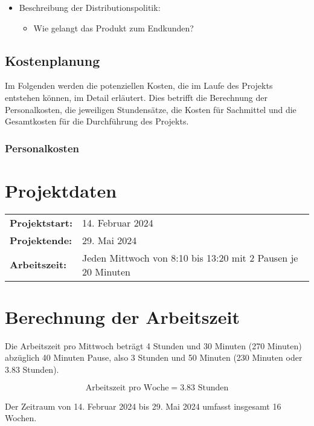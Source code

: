 \begin{itemize}
\item
  Beschreibung der Distributionspolitik:

  \begin{itemize}
  
  \item
    Wie gelangt das Produkt zum Endkunden?
  \end{itemize}
\end{itemize}

\subsection{Kostenplanung}\label{kostenplanung}

Im Folgenden werden die potenziellen Kosten, die im Laufe des Projekts entstehen können, im Detail erläutert. Dies betrifft die Berechnung der Personalkosten, die jeweiligen Stundensätze, die Kosten für Sachmittel und die Gesamtkosten für die Durchführung des Projekts.

\subsubsection{Personalkosten}\label{personalkosten}

\section*{Projektdaten}
\begin{tabular}{ll}
  \toprule
  \textbf{Projektstart:} & 14. Februar 2024 \\
  \textbf{Projektende:} & 29. Mai 2024 \\
  \textbf{Arbeitszeit:} & Jeden Mittwoch von 8:10 bis 13:20 mit 2 Pausen je 20 Minuten \\
  \bottomrule
\end{tabular}

\section*{Berechnung der Arbeitszeit}
Die Arbeitszeit pro Mittwoch beträgt 4 Stunden und 30 Minuten (270 Minuten) abzüglich 40 Minuten Pause, also 3 Stunden und 50 Minuten (230 Minuten oder 3.83 Stunden).

\[
  \text{Arbeitszeit pro Woche} = 3.83 \text{ Stunden}
\]

Der Zeitraum von 14. Februar 2024 bis 29. Mai 2024 umfasst insgesamt 16 Wochen.

